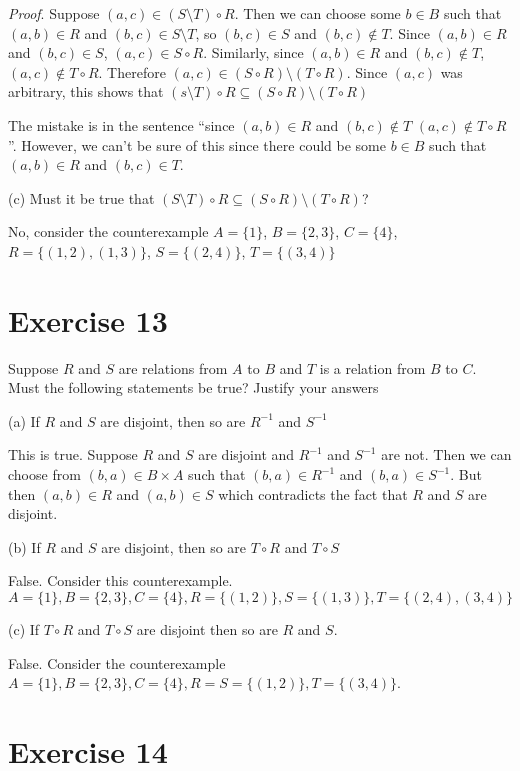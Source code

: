 \documentclass[11pt]{article}
\begin{document}
\textit{Proof}. Suppose $(a,c) \in (S \setminus T) \circ R$. Then we can choose 
some $b \in B$ such that $(a,b) \in R$ and $(b,c) \in S \setminus T$, so 
$(b,c) \in S$ and $(b,c) \notin T$. Since $(a,b) \in R$ and $(b,c) \in S$,
$(a,c) \in S \circ R$. Similarly, since $(a,b) \in R$ and $(b,c) \notin T$,
$(a,c) \notin T \circ R$. Therefore $(a,c) \in (S \circ R) \setminus (T \circ R)$.
Since $(a, c)$ was arbitrary, this shows that 
$(s \setminus T) \circ R \subseteq (S \circ R) \setminus (T \circ R)$ 

The mistake is in the sentence ``since $(a,b) \in R$ and $(b,c) \notin T$
$(a,c) \notin T \circ R$''. However, we can't be sure of this since there could 
be some $b \in B$ such that $(a,b) \in R$ and $(b, c) \in T$.

\noindent (c) Must it be true that 
$(S \setminus T) \circ R \subseteq (S \circ R) \setminus (T \circ R)$?

No, consider the counterexample $A = \{1\}$, $B = \{2,3\}$, $C = \{4\}$,
$R=\{(1,2), (1,3)\}$, $S=\{(2,4)\}$, $T=\{(3,4)\}$

\section*{Exercise 13}

Suppose $R$ and $S$ are relations from $A$ to $B$ and $T$ is a relation from $B$
to $C$. Must the following statements be true? Justify your answers

\noindent (a) If $R$ and $S$ are disjoint, then so are $R^{-1}$ and $S^{-1}$

This is true. Suppose $R$ and $S$ are disjoint and $R^{-1}$ and $S^{-1}$ are not.
Then we can choose from $(b,a) \in B \times A$ such that $(b,a) \in R^{-1}$
and $(b,a) \in S^{-1}$. But then $(a,b) \in R$ and $(a,b) \in S$ which contradicts 
the fact that $R$ and $S$ are disjoint.

\noindent (b) If $R$ and $S$ are disjoint, then so are $T \circ R$ and $T \circ S$

False. Consider this counterexample. $A = \{1\}, B=\{2,3\}, C = \{4\}, 
R = \{(1,2)\}, S=\{(1,3)\}, T=\{(2,4),(3,4)\}$

\noindent (c) If $T \circ R$ and $T \circ S$ are disjoint then so are $R$ and $S$.

False. Consider the counterexample $A=\{1\}, B=\{2,3\}, C=\{4\}, R=S=\{(1,2)\},
T=\{(3,4)\}$.

\section*{Exercise 14}
\end{document}

